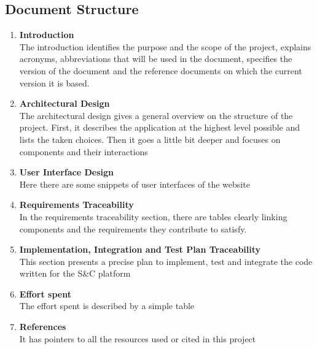 
\subsection{Document Structure}
    \begin{enumerate}
        \item\textbf{Introduction}\\
        The introduction identifies the purpose and the scope of the project, explains acronyms, abbreviations that will be used in the document, specifies the version of the document and the reference documents on which the current version it is based.
        \item\textbf{Architectural Design}\\
        The architectural design gives a general overview on the structure of the project. First, it describes the application at the highest level possible and lists the taken choices. Then it goes a little bit deeper and focuses on components and their interactions
        \item\textbf{User Interface Design} \\
        Here there are some snippets of user interfaces of the website
        \item\textbf{Requirements Traceability} \\
        In the requirements traceability section, there are tables clearly linking components and the requirements they contribute to satisfy.
        \item\textbf{Implementation, Integration and Test Plan Traceability} \\ 
         This section presents a precise plan to implement, test and integrate the code written for the S\&C platform
        \item\textbf{Effort spent} \\
        The effort spent is described by a simple table
        \item\textbf{References}\\
        It has pointers to all the resources used or cited in this project
    \end{enumerate}


